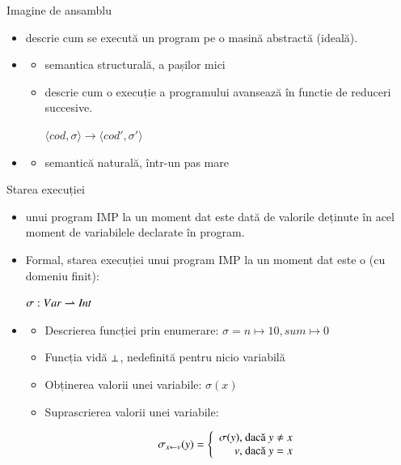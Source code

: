 \documentclass[xcolor=pdftex,romanian,colorlinks]{beamer}
\begin{document}
\begin{frame}{Imagine de ansamblu}

\begin{itemize}
	\item {} descrie cum se execută un program pe o masină abstractă (ideală).
	
	\medskip  
	\item {}
	\begin{itemize}
		\item  semantica structurală, a pașilor mici
		\item descrie cum o execuție a programului avansează în functie de reduceri succesive.
	\begin{center}
	$\langle cod, \sigma \rangle \to   \langle cod', \sigma' \rangle$
	\end{center}
	\end{itemize}
			
	\medskip  
	\item {}  
	\begin{itemize}
		\item semantică naturală, într-un pas mare
	\end{itemize}
\end{itemize}
\end{frame}

\begin{frame}{Starea execuției}

\begin{itemize}
	\item {} unui program IMP la un moment dat este dată de valorile deținute în acel moment de variabilele declarate în program.
	\medskip
	\item Formal, starea execuției unui program IMP la un moment dat este o  (cu domeniu finit):
	\begin{center}
	$\sigma : Var \rightharpoonup{\text{\itshape Int}\/}$ 
	\end{center}
	\medskip  
	\item {}
	\begin{itemize}
		\item Descrierea funcției prin enumerare: $\sigma = n \mapsto 10, sum \mapsto 0$
		\item Funcția vidă $\perp$, nedefinită pentru nicio variabilă
		\item Obținerea valorii unei variabile: $\sigma(x)$
		\item Suprascrierea valorii unei variabile:

$$\sigma_{x\leftarrow v} (y) = \left\{\begin{array}{r@{\mbox{, dacă }}l}
\sigma	(y) & y \neq x \\
v & y = x
\end{array}
\right.$$
	\end{itemize}
\end{itemize}
\end{frame}
\end{document}

